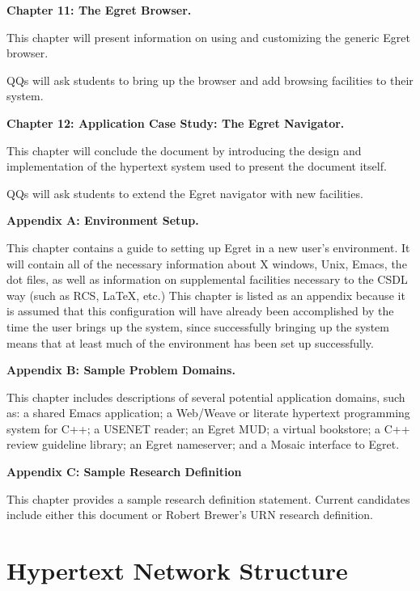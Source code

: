 \begin{itemizenoindent}
\item {\bf Chapter 11: The Egret Browser.}

This chapter will present information on using and customizing the generic
Egret browser.

QQs will ask students to bring up the browser and add browsing facilities
to their system.

\item {\bf Chapter 12: Application Case Study: The Egret Navigator.}

This chapter will conclude the document by introducing the design and 
implementation of the hypertext system used to present the document itself.

QQs will ask students to extend the Egret navigator with new facilities. 

\item {\bf Appendix A: Environment Setup.}

This chapter contains a guide to setting up Egret in a new user's
environment.  It will contain all of the necessary information about X
windows, Unix, Emacs, the dot files, as well as information on supplemental
facilities necessary to the CSDL way (such as RCS, LaTeX, etc.)  This
chapter is listed as an appendix because it is assumed that this
configuration will have already been accomplished by the time the user
brings up the system, since successfully bringing up the system means that
at least much of the environment has been set up successfully.

\item {\bf Appendix B: Sample Problem Domains.}

This chapter includes descriptions of several potential application
domains, such as: a shared Emacs application; a Web/Weave or literate
hypertext programming system for C++; a USENET reader; an Egret MUD; a
virtual bookstore; a C++ review guideline library; an Egret nameserver; and a
Mosaic interface to Egret. 

\item {\bf Appendix C: Sample Research Definition}

This chapter provides a sample research definition statement.  
Current candidates include either this document or Robert Brewer's 
URN research definition.

\end{itemizenoindent}


\section{Hypertext Network Structure}

